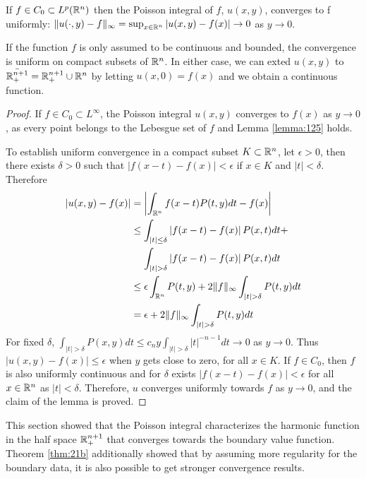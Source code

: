 \begin{theorem}\label{thm:21b}
    If $f\in C_0\subset L^p(\mathbb R^n)$ then the Poisson integral of $f$, $u(x,y)$, converges to f uniformly: $\|u(\cdot,y)-f\|_\infty=\sup_{x\in\mathbb R^n}|u(x,y)-f(x)|\rightarrow0$ as $y\rightarrow0$. 
    
    If the function $f$ is only assumed to be continuous and bounded, the convergence is uniform on compact subsets of $\mathbb R^n$. In either case, we can exted $u(x,y)$ to $\Bar{\mathbb R^{n+1}_+}=\mathbb R_+^{n+1}\cup\mathbb R^n$ by letting $u(x,0)=f(x)$ and we obtain a continuous function.
\end{theorem}
\begin{proof}
    If $f\in C_0\subset L^\infty$, the Poisson integral $u(x,y)$ converges to $f(x)$ as $y\rightarrow0$, as every point belongs to the Lebesgue set of $f$ and Lemma \ref{lemma:125} holds.

    To establish uniform convergence in a compact subset $K\subset\mathbb R^n$, let $\epsilon>0$, then there exists $\delta>0$ such that $|f(x-t)-f(x)|<\epsilon$ if $x\in K$ and $|t|<\delta$. Therefore
    \begin{align*}
        |u(x,y)-f(x)|&=\left|\int_{\RR^n}f(x-t)P(t,y)dt- f(x) \right| \\
        &\leq\int_{|t|\leq\delta}\left|f(x-t)-f(x)\right|P(x,t)dt+ \\
        &\quad\,\int_{|t|>\delta}\left|f(x-t)-f(x)\right|P(x,t)dt \\
        &\leq\epsilon\int_{\RR^n}P(t,y)+2\|f\|_\infty\int_{|t|>\delta}P(t,y)dt \\
        &=\epsilon+2\|f\|_\infty\int_{|t|>\delta}P(t,y)dt
    \end{align*}
    For fixed $\delta$, $\int_{|t|>\delta}P(x,y)dt\leq c_ny\int_{|t|>\delta}|t|^{-n-1}dt\rightarrow0$ as $y\rightarrow0$. Thus $|u(x,y)-f(x)|\leq\epsilon$ when $y$ gets close to zero, for all $x\in K$. If $f\in C_0$, then $f$ is also uniformly continuous and for $\delta$ exists $|f(x-t)-f(x)|<\epsilon$ for all $x\in\mathbb R^n$ as $|t|<\delta$. Therefore, $u$ converges uniformly towards $f$ as $y\rightarrow0$, and the claim of the lemma is proved.
\end{proof}

This section showed that the Poisson integral characterizes the harmonic function in the half space $\mathbb R^{n+1}_+$ that converges towards the boundary value function. Theorem \ref{thm:21b} additionally showed that by assuming more regularity for the boundary data, it is also possible to get stronger convergence results.

